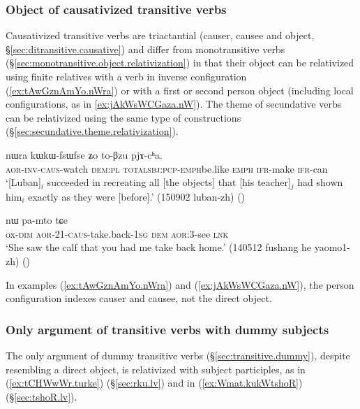 \subsubsection{Object of causativized transitive verbs} \label{sec:object.causative.relativization}
Causativized transitive verbs are triactantial (causer, causee and object, §\ref{sec:ditransitive.causative}) and differ from monotransitive verbs (§\ref{sec:monotransitive.object.relativization}) in that their object can be relativized using finite relatives with a verb in inverse configuration (\ref{ex:tAwGznAmYo.nWra}) or with a first or second person object (including local configurations, as in \ref{ex:jAkWsWCGaza.nW}). The theme of secundative verbs can be relativized using the same type of constructions (§\ref{sec:secundative.theme.relativization}).

\begin{exe}
\ex \label{ex:tAwGznAmYo.nWra}
\gll [tɤ́-wɣ-z-nɤmɲo] nɯra kɯ\redp{}kɯ-fsɯ\redp{}fse ʑo to-βzu pjɤ-cʰa.   \\
\textsc{aor}-\textsc{inv}-\textsc{caus}-watch \textsc{dem}:\textsc{pl} \textsc{total}\redp{}\textsc{sbj}:\textsc{pcp}-\textsc{emph}\redp{}be.like \textsc{emph} \textsc{ifr}-make \textsc{ifr}-can \\
\glt `[Luban]$_i$ succeeded in recreating all [the objects] that [his teacher]$_j$ had shown him$_i$ exactly as they were [before].' (150902 luban-zh)
()
\end{exe} 
 
\begin{exe}
\ex \label{ex:jAkWsWCGaza.nW}
 nɯ pa-mto tɕe \\
ox-\textsc{dim} \textsc{aor}-2\fl{}1-\textsc{caus}-take.back-\textsc{1sg} \textsc{dem} \textsc{aor}:3\flobv{}-see \textsc{lnk} \\
\glt `She saw the calf that you had me take back home.' (140512 fushang he yaomo1-zh)
()
\end{exe} 

In examples (\ref{ex:tAwGznAmYo.nWra}) and (\ref{ex:jAkWsWCGaza.nW}), the person configuration indexes causer and causee, not the direct object. 

\subsubsection{Only argument of transitive verbs with dummy subjects}  \label{sec:dummy.subj.object.relativization}
The only argument of dummy transitive verbs (§\ref{sec:transitive.dummy}), despite resembling a direct object, is relativized with subject participles, as  in (\ref{ex:tCHWwWr.turke}) (§\ref{sec:rku.lv}) and  in (\ref{ex:Wmat.kukWtshoR}) (§\ref{sec:tshoR.lv}). 


